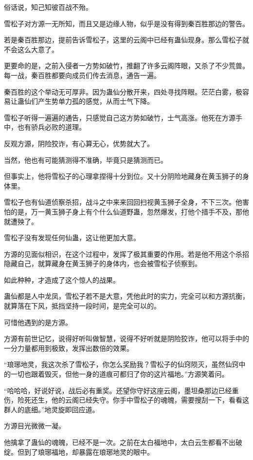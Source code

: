 \begin{this_body}
俗话说，知己知彼百战不殆。

雪松子对方源一无所知，而且又是边缘人物，似乎是没有得到秦百胜那边的警告。

若是秦百胜那边，提前告诉雪松子，这里的云阁中已经有蛊仙现身。那么雪松子就不会这么大意了。

更要命的是，之前入侵者一方势如破竹，推翻了许多云阁阵眼，又杀了不少荒兽。每一战，秦百胜都要向成员们传去消息，通告一遍。

秦百胜的这个举动无可厚非。因为蛊仙分散开来，四处寻找阵眼。茫茫白雾，极容易让蛊仙们产生势单力孤的感觉，从而士气下降。

雪松子听得一遍遍的通告，只感觉自己这方势如破竹，士气高涨。他死在方源手中，也有骄兵必败的道理。

反观方源，阴险狡诈，有心算无心，优势就大了。

当然，他也有可能猜测得不准确，毕竟只是猜测而已。

但事实上，他将雪松子的心理拿捏得十分到位。又十分阴险地藏身在黄玉狮子的身体里。

雪松子也有仙道侦察杀招，战斗之中来来回回扫视黄玉狮子全身，不下三次。他害怕的是，万一黄玉狮子身上有个什么仙道野蛊，忽然爆发，打他个措手不及，那他就遭殃了。

雪松子没有发现任何仙蛊，这让他更加大意。

方源的见面似相识，在这个过程中，发挥了极其重要的作用。若是他不用这个杀招隐藏自己，就算藏身在黄玉狮子的身体内，也会被雪松子侦察到。

如此种种，才造成了这个惊人的战果。

蛊仙都是人中龙凤，雪松子若不是大意，凭他此时的实力，完全可以和方源抗衡，就算落在下风，抵挡坚持一段时间，是完全可以的。

可惜他遇到的是方源。

方源有前世记忆，说得好听叫做智慧，说得不好听就是阴险狡诈，他可以将手中的一分力量都用到极致，发挥出数倍的效果。

“琅琊地灵，我这次杀了雪松子，你怎么奖励我？雪松子的仙窍陨灭，虽然仙窍中的一切也跟着毁灭，但他一身的道痕可都归了你的这片福地。”方源笑着问。

“哈哈哈，好说好说，战后必有重奖。还望你守好这座云阁，墨坦桑那边已经重伤，险死还生，他的云阁已经失守。你手中雪松子的魂魄，需要搜刮一下，看看这群人的底细。”地灵旋即回应道。

方源目光微微一凝。

他擒拿了蛊仙的魂魄，已经不是一次。之前在太白福地中，太白云生都看不出破绽。但到了琅琊福地，却暴露在琅琊地灵的眼中。


\end{this_body}
